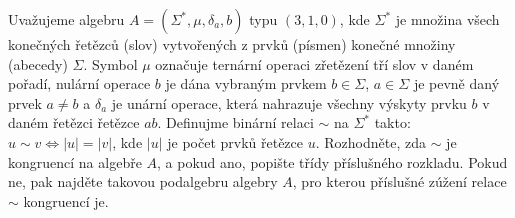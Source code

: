 Uvažujeme algebru $A=\left ( \Sigma ^{*},\mu , \delta_{a},b \right )$ typu
$(3,1,0)$, kde $\Sigma^{*}$ je množina všech konečných řetězců (slov)
vytvořených z prvků (písmen) konečné množiny (abecedy) $\Sigma$. Symbol $\mu$
označuje ternární operaci zřetězení tří slov v daném pořadí, nulární operace $b$
je dána vybraným prvkem $b \in \Sigma$, $a \in \Sigma$ je pevně daný prvek $a
\neq b$ a $\delta_{a}$ je unární operace, která nahrazuje všechny výskyty prvku
$b$ v daném řetězci řetězce $ab$. Definujme binární relaci $\sim$ na
$\Sigma^{*}$ takto: $u \sim v \Leftrightarrow \left | u \right |=\left | v
\right |$, kde $\left | u \right |$ je počet prvků řetězce $u$. Rozhodněte, zda
$\sim$ je kongruencí na algebře $A$, a pokud ano, popište třídy příslušného
rozkladu. Pokud ne, pak najděte takovou podalgebru algebry $A$, pro kterou
příslušné zúžení  relace $\sim$ kongruencí je.
